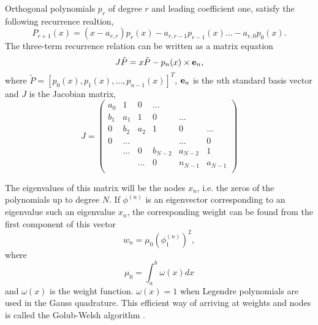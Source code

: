     Orthogonal polynomials $p_r$ of degree $r$ and 
    leading coefficient one, satisfy the following recurrence realtion,
    \begin{equation}
        P_{r+1}(x) = (x - a_{r,r})p_r(x) - a_{r,r-1}p_{r-1}(x) \dots -a_{r,0}p_0(x).
    \end{equation}
    The three-term recurrence relation can be written as a matrix equation
    \begin{equation}
        J\tilde{P} = x\tilde{P} - p_n(x) \times \vb{e}_n,
    \end{equation}
    where $\tilde{P} = [p_0(x),p_1(x),\dots,p_{n-1}(x)]^T$, $\vb{e}_n$ is the $n$th 
    standard basis vector and $J$ is the Jacobian matrix,
    \begin{equation}
        J = \begin{pmatrix}
            a_0 &    1  &    0  & \dots   &         & \\
            b_1 &  a_1  &    1  &    0    & \dots   & \\
            0   &  b_2  &   a_2 &    1    &    0    & \dots\\
            0   & \dots &       &         & \dots   & 0 \\
                & \dots &   0   & b_{N-2} & a_{N-2} & 1 \\
                &       & \dots &      0  & n_{N-1} & a_{N-1} \\
        \end{pmatrix}
    \end{equation}

    The eigenvalues of this matrix will be the nodes $x_n$, i.e. the zeros of the 
    polynomials up to degree $N$. If $\phi^{(n)}$ is an eigenvector corresponding to 
    an eigenvalue such an eigenvalue $x_n$, the corresponding weight can be found 
    from the first component of this vector
    \begin{equation}
        w_n = \mu_0 \left(\phi_1^{(n)} \right)^2,
    \end{equation}
    where 
    \begin{equation*}
        \mu_0 = \int_a^b \omega(x) dx
    \end{equation*}
    and $\omega(x)$ is the weight function. $\omega(x) = 1$ when Legendre polynomials
    are used in the Gauss quadrature. This efficient way of arriving at weights and 
    nodes is called the Golub-Welsh algorithm \cite{golub1969calculation}.
   

